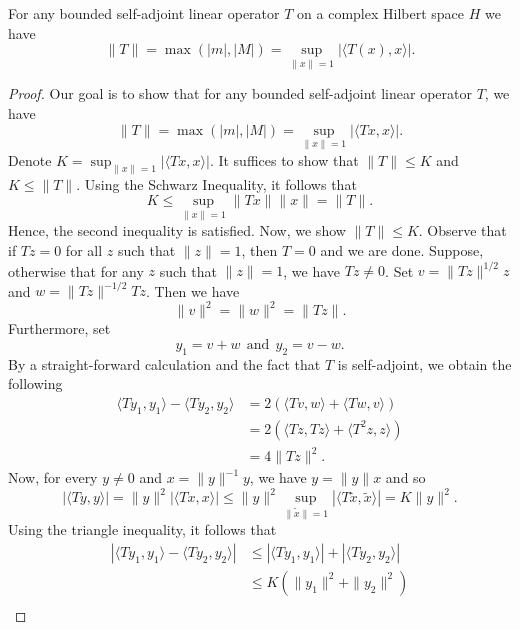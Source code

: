 \begin{theorem}\label{9.2-2}
    For any bounded self-adjoint linear operator \( T \) on a complex Hilbert space \( H  \) we have 
    \[  \|T\| = \max(| m | , | M | ) = \sup_{\|x\|=1} | \langle T(x) , x \rangle |.  \]
\end{theorem}

\begin{proof}
Our goal is to show that for any bounded self-adjoint linear operator \( T  \), we have 
\[  \|T\| = \max (| m | , | M | ) = \sup_{\|x\| = 1} | \langle Tx , x \rangle |. \]
Denote \( K = \sup_{\|x\| = 1} | \langle Tx , x \rangle |  \). It suffices to show that \( \|T\| \leq K  \) and \( K \leq \|T\| \). Using the Schwarz Inequality, it follows that
\[  K \leq \sup_{\|x\| =1} \|Tx\| \|x\| = \|T\|. \]
Hence, the second inequality is satisfied. Now, we show \( \|T\| \leq K  \). Observe that if \( Tz = 0  \) for all \( z  \) such that \( \|z\| = 1  \), then \( T  = 0  \) and we are done. Suppose, otherwise that for any \( z  \) such that \( \|z\| = 1  \), we have \( Tz \neq 0  \). Set \( v = \|Tz\|^{1/2} z  \) and \( w = \|Tz\|^{-1/2} Tz  \). Then we have
\[  \|v\|^{2} = \|w\|^{2} = \|Tz\|. \]
Furthermore, set 
\[  {y}_{1} = v + w  \ \ \text{and} \ \ {y}_{2} = v - w. \]
By a straight-forward calculation and the fact that \( T  \) is self-adjoint, we obtain the following 
\begin{align*}
    \langle T {y}_{1} ,  {y}_{1} \rangle - \langle T {y}_{2} ,  {y}_{2} \rangle &= 2 (\langle Tv  , w  \rangle + \langle Tw , v  \rangle) \\
                                                                                &= 2 (\langle Tz  , Tz   \rangle + \langle T^{2} z  ,  z  \rangle) \\ 
                                                                                &= 4 \|Tz\|^{2}.
\end{align*}
Now, for every \( y \neq 0  \) and \( x =  \|y\|^{-1} y  \), we have \( y = \|y\| x  \) and so 
\[  | \langle Ty , y \rangle | = \|y\|^{2} | \langle Tx , x \rangle |  \leq \|y\|^{2} \sup_{\|\tilde{x}\|   = 1} | \langle T \tilde{x} , \tilde{x} \rangle | = K \|y\|^{2}. \]
Using the triangle inequality, it follows that 
\begin{align*}
    | \langle T {y}_{1} , {y}_{1} \rangle - \langle T {y}_{2} , {y}_{2} \rangle | &\leq | \langle T {y}_{1}  ,  {y}_{1} \rangle  |  + | \langle T {y}_{2} ,  {y}_{2} \rangle |  \\
                                                                                  &\leq K (\|{y}_{1}\|^{2} + \|{y}_{2}\|^{2}) \\

\end{align*}
\end{proof}

